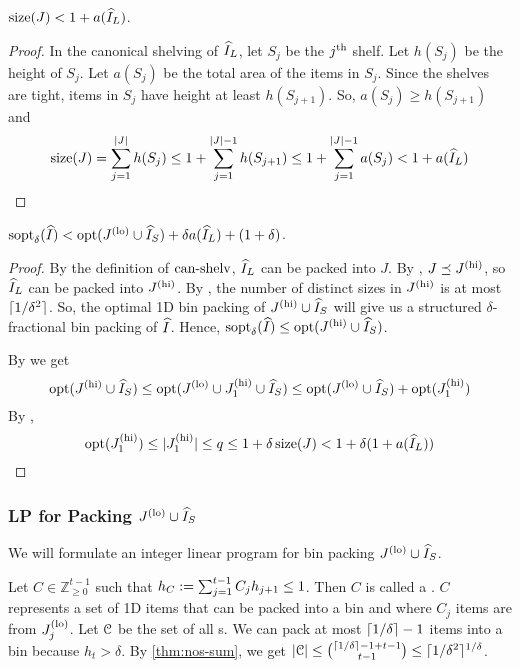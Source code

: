 \begin{lemma}
\label{thm:hgap:can-shelv-size}
$\operatorname{size}(J) < 1 + a(\widehat{I}_L)$.
\end{lemma}
\begin{proof}
In the canonical shelving of $\widehat{I}_L$, let $S_j$ be the $j^{\textrm{th}}$ shelf.
Let $h(S_j)$ be the height of $S_j$.
Let $a(S_j)$ be the total area of the items in $S_j$.
Since the shelves are tight, items in $S_j$ have height at least $h(S_{j+1})$.
So, $a(S_j) \ge h(S_{j+1})$ and
\[ \operatorname{size}(J) = \sum_{j=1}^{|J|} h(S_j) \le 1 + \sum_{j=1}^{|J|-1} h(S_{j+1})
\le 1 + \sum_{j=1}^{|J|-1} a(S_j) < 1 + a(\widehat{I}_L) \qedhere \]
\end{proof}

\begin{lemma}
\label{thm:hgap:sopt-le-optlo}
$\operatorname{sopt}_{\delta}(\widehat{I}) < \operatorname{opt}(J^{\mathrm{(lo)}} \cup \widehat{I}_S) + \delta a(\widehat{I}_L) + (1 + \delta)$.
\end{lemma}
\begin{proof}
By the definition of $\operatorname{can-shelv}$, $\widehat{I}_L$ can be packed into $J$.
By , $J \preceq J^{\mathrm{(hi)}}$, so $\widehat{I}_L$ can be packed into $J^{\mathrm{(hi)}}$.
By , the number of distinct sizes in $J^{\mathrm{(hi)}}$
is at most $\lceil 1/\delta^2 \rceil$.
So, the optimal 1D bin packing of $J^{\mathrm{(hi)}} \cup \widehat{I}_S$ will
give us a structured $\delta$-fractional bin packing of $\widehat{I}$.
Hence, $\operatorname{sopt}_{\delta}(\widehat{I}) \le \operatorname{opt}(J^{\mathrm{(hi)}} \cup \widehat{I}_S)$.

By  we get
\[ \operatorname{opt}(J^{\mathrm{(hi)}} \cup \widehat{I}_S) \le \operatorname{opt}(J^{\mathrm{(lo)}} \cup J_1^{\mathrm{(hi)}} \cup \widehat{I}_S)
\le \operatorname{opt}(J^{\mathrm{(lo)}} \cup \widehat{I}_S) + \operatorname{opt}(J_1^{\mathrm{(hi)}}) \]
By ,
\[ \operatorname{opt}(J_1^{\mathrm{(hi)}}) \le |J_1^{\mathrm{(hi)}}| \le q \le 1 + \delta\operatorname{size}(J)
< 1 + \delta(1 + a(\widehat{I}_L)) \qedhere \]
\end{proof}

\subsubsection{LP for Packing \texorpdfstring{$J^{\mathrm{(lo)}} \cup \widehat{I}_S$}{J\^{}lo + I\^{}\_S}}

We will formulate an integer linear program for bin packing $J^{\mathrm{(lo)}} \cup \widehat{I}_S$.

Let $C \in \mathbb{Z}_{\ge 0}^{t-1}$ such that $h_C := \sum_{j=1}^{t-1} C_jh_{j+1} \le 1$.
Then $C$ is called a \config{}.
$C$ represents a set of 1D items that can be packed into a bin
and where $C_j$ items are from $J_j^{\mathrm{(lo)}}$.
Let $\mathcal{C}$ be the set of all \config{}s.
We can pack at most $\left\lceil 1/\delta \right\rceil-1$ items into a bin because $h_t > \delta$.
By \cref{thm:nos-sum}, we get
$|\mathcal{C}| \le \binom{\left\lceil 1/\delta \right\rceil-1+t-1}{t-1} \le \lceil 1/\delta^2 \rceil^{1/\delta}$.

